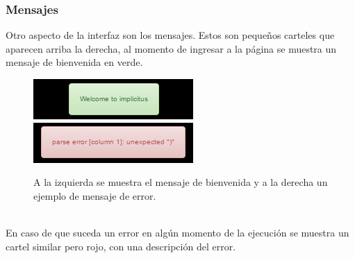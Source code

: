 \documentclass[12pt]{article}
\begin{document}
\subsubsection{Mensajes}
Otro aspecto de la interfaz son los mensajes. Estos son pequeños carteles que aparecen arriba la derecha, al momento de ingresar a la página se muestra un mensaje de bienvenida en verde.
\begin{figure}[ht]
\includegraphics[width =0.45\linewidth]{welcome.png}
\hfill
\includegraphics[width =0.45\linewidth]{error.png}
\caption{A la izquierda se muestra el mensaje de bienvenida y a la derecha un ejemplo de mensaje de error.}
\label{ fig : surface }
\end{figure}
\\En caso de que suceda un error en algún momento de la ejecución se muestra un cartel similar pero  rojo, con una descripción del error.
\end{document}
